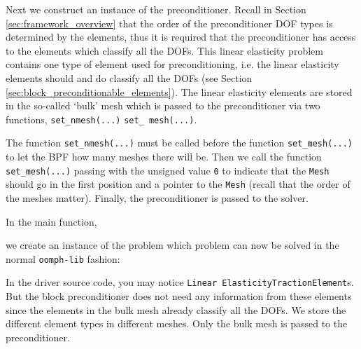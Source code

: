Next we construct an instance of the preconditioner. Recall in Section
\ref{sec:framework_overview} that the order of the preconditioner DOF types is
determined by the elements, thus it is required that the preconditioner has
access to the elements which classify all the DOFs. This linear elasticity
problem contains one type of element used for preconditioning, i.e. the linear
elasticity elements should and do classify all the DOFs (see Section
\ref{sec:block_preconditionable_elements}). The linear elasticity elements are
stored in the so-called `bulk' mesh which is passed to the preconditioner via
two functions, \texttt{set\_\allowbreak nmesh(...)} \texttt{set\_\allowbreak
  mesh(...)}. 
\lstset{numberstyle=\scriptsize,breaklines=true, numbers=left, stepnumber=2, frame=single,basicstyle=\ttfamily\scriptsize, showstringspaces=false, language=C++}

The function \texttt{set\_\allowbreak nmesh(...)} must be called before the function \texttt{set\_\allowbreak mesh(...)} to let the BPF how many meshes there will be. Then we call the function \texttt{set\_\allowbreak mesh(...)} passing with the unsigned value \texttt{0} to indicate that the \texttt{Mesh} should go in the first position and a pointer to the \texttt{Mesh} (recall that the order of the meshes matter).
Finally, the preconditioner is passed to the solver.



In the main function,
\lstset{numberstyle=\scriptsize,breaklines=true, numbers=left, stepnumber=2, frame=single,basicstyle=\ttfamily\scriptsize, showstringspaces=false, language=C++}

we create an instance of the  problem which problem can now be solved in the normal \texttt{oomph-\allowbreak lib} fashion:
\lstset{numberstyle=\scriptsize,breaklines=true, numbers=left, stepnumber=2, frame=single,basicstyle=\ttfamily\scriptsize, showstringspaces=false, language=C++}


In the driver source code, you may notice \texttt{Linear\allowbreak
  Elasticity\allowbreak Traction\allowbreak Element}s.  But the block
preconditioner does not need any information from these elements since the
elements in the bulk mesh already classify all the DOFs. We store the different
element types in different meshes. Only the bulk mesh is passed to the
preconditioner. 

